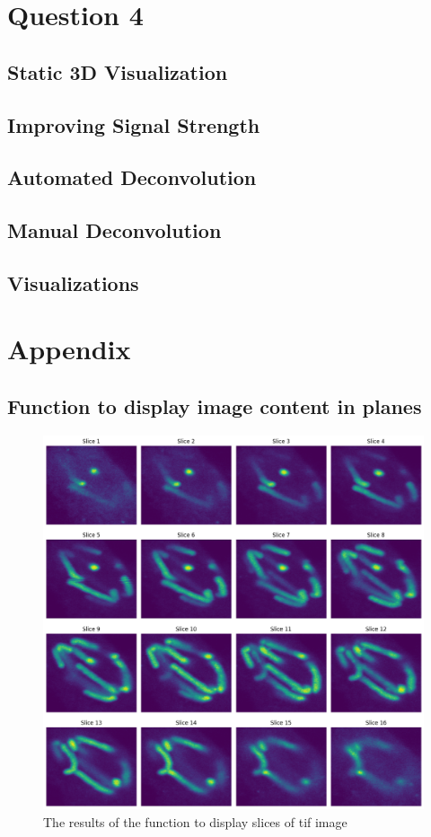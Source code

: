 \documentclass{article}
\begin{document}
\clearpage
\section*{Question 4}
\subsection*{Static 3D Visualization}
\subsection*{Improving Signal Strength}
\subsection*{Automated Deconvolution}
\subsection*{Manual Deconvolution}
\subsection*{Visualizations}
\clearpage
\section*{Appendix}
\subsection*{Function to display image content in planes}
\begin{figure}[h!]
    \centering
    \includegraphics[width=1\linewidth]{Report/Images/3d_plot.png}
    \caption{The results of the function to display slices of tif image}
    \label{fig:3d-plane-image}
\end{figure}
% 
% 
\end{document}
